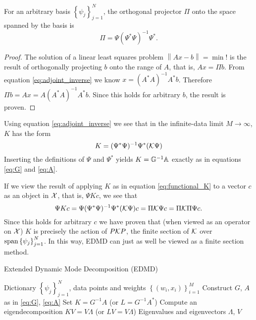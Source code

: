 \begin{lemma}
    For an arbitrary basis $\left\{ \psi_j \right\}_{j=1}^N$, the orthogonal projector $\Pi$ 
    onto the space spanned by the basis is 
    \begin{equation}
        \Pi = \Psi (\Psi^* \Psi)^{-1} \Psi^* . 
    \end{equation}
\end{lemma}

\begin{proof}
    The solution of a linear least squares problem $\left\| Ax - b \right\| = \min !$ is 
    the result of orthogonally projecting $b$ onto the range of $A$, that is, $A x = \Pi b$. 
    From equation \ref{eq:adjoint_inverse} we know $x = (A^* A)^{-1} A^* b$. Therefore 
    $\Pi b = A x = A (A^* A)^{-1} A^* b$. Since this holds for arbitrary $b$, the result 
    is proven. 
\end{proof}

Using equation \ref{eq:adjoint_inverse} we see that in the infinite-data limit 
$M \to \infty$, $K$ has the form
\begin{equation}
    \label{eq:functional_K}
    K = (\Psi^* \Psi)^{-1} \Psi^* (\mathcal{K} \Psi)
\end{equation}
Inserting the definitions of $\Psi$ and $\Psi^*$ yields $K = \mathbb{G}^{-1} \mathbb{A}$ exactly as 
in equations \ref{eq:G} and \ref{eq:A}. 

If we view the result of applying $K$ as in equation \ref{eq:functional_K} to a vector 
$c$ as an object in $\mathcal{X}$, that is, $\Psi K c$, we see that 
\begin{equation}
    \label{eq:PKP}
    \Psi K c = \Psi (\Psi^* \Psi)^{-1} \Psi^* (\mathcal{K} \Psi) c
    = \Pi \mathcal{K} \Psi c = \Pi \mathcal{K} \Pi \Psi c . 
\end{equation}
Since this holds for arbitrary $c$ we have proven that (when viewed as an operator 
on $\mathcal{X}$) $K$ is precisely the action of $P \mathcal{K} P$, the finite section of $\mathcal{K}$ 
over $\text{span} \left\{ \psi_j \right\}_{j=1}^N$. In this way, EDMD can just as well be viewed 
as a finite section method. 

\begin{algorithm}
    \caption{Extended Dynamic Mode Decomposition (EDMD)}
    \label{alg:edmd}
    \begin{algorithmic}[1]
        \Require Dictionary $\left\{ \psi_j \right\}_{j=1}^N$, data points and weights 
            $\left\{ (w_i, x_i) \right\}_{i=1}^M$
        \State Construct $G$, $A$ as in \ref{eq:G}, \ref{eq:A}
        \State Set $K = G^{-1} A$ (or $L = G^{-1} A^*$)
        \State Compute an eigendecomposition $K V = V \Lambda$ (or $L V = V \Lambda$)
        \State \Return Eigenvalues and eigenvectors $\Lambda$, $V$
    \end{algorithmic}
\end{algorithm}

